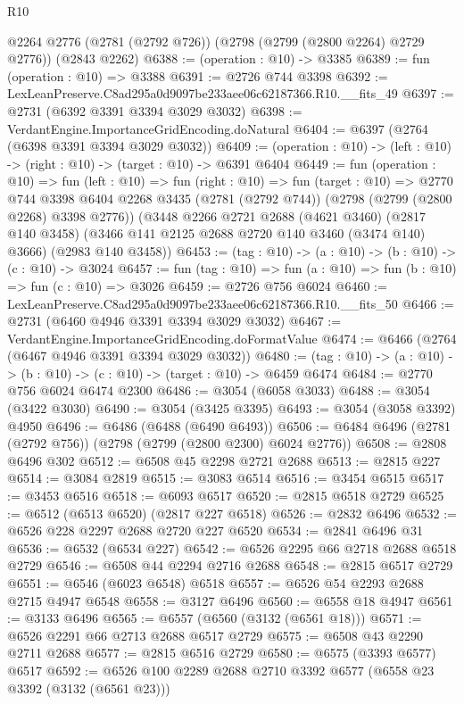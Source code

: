 \begin{lexlean}{R10}
\begin{coremodule}
    @2264
    @2776
    (@2781 (@2792 @726))
    (@2798 (@2799 (@2800 @2264) @2729 @2776))
    (@2843 @2262)
@6388 := (operation : @10) -> @3385
@6389 := fun (operation : @10) => @3388
@6391 := @2726 @744 @3398
@6392 := LexLeanPreserve.C8ad295a0d9097be233aee06c62187366.R10.__fits_49
@6397 := @2731 (@6392 @3391 @3394 @3029 @3032)
@6398 := VerdantEngine.ImportanceGridEncoding.doNatural
@6404 := @6397 (@2764 (@6398 @3391 @3394 @3029 @3032))
@6409 := (operation : @10) -> (left : @10) -> (right : @10) -> (target : @10) -> @6391 @6404
@6449 := fun (operation : @10) =>
  fun (left : @10) =>
  fun (right : @10) =>
  fun (target : @10) =>
  @2770
    @744
    @3398
    @6404
    @2268
    @3435
    (@2781 (@2792 @744))
    (@2798 (@2799 (@2800 @2268) @3398 @2776))
    (@3448
      @2266
      @2721
      @2688
      (@4621 @3460)
      (@2817 @140 @3458)
      (@3466 @141 @2125 @2688 @2720 @140 @3460 (@3474 @140) @3666)
      (@2983 @140 @3458))
@6453 := (tag : @10) -> (a : @10) -> (b : @10) -> (c : @10) -> @3024
@6457 := fun (tag : @10) => fun (a : @10) => fun (b : @10) => fun (c : @10) => @3026
@6459 := @2726 @756 @6024
@6460 := LexLeanPreserve.C8ad295a0d9097be233aee06c62187366.R10.__fits_50
@6466 := @2731 (@6460 @4946 @3391 @3394 @3029 @3032)
@6467 := VerdantEngine.ImportanceGridEncoding.doFormatValue
@6474 := @6466 (@2764 (@6467 @4946 @3391 @3394 @3029 @3032))
@6480 := (tag : @10) -> (a : @10) -> (b : @10) -> (c : @10) -> (target : @10) -> @6459 @6474
@6484 := @2770 @756 @6024 @6474 @2300
@6486 := @3054 (@6058 @3033)
@6488 := @3054 (@3422 @3030)
@6490 := @3054 (@3425 @3395)
@6493 := @3054 (@3058 @3392) @4950
@6496 := @6486 (@6488 (@6490 @6493))
@6506 := @6484 @6496 (@2781 (@2792 @756)) (@2798 (@2799 (@2800 @2300) @6024 @2776))
@6508 := @2808 @6496 @302
@6512 := @6508 @45 @2298 @2721 @2688
@6513 := @2815 @227
@6514 := @3084 @2819
@6515 := @3083 @6514
@6516 := @3454 @6515
@6517 := @3453 @6516
@6518 := @6093 @6517
@6520 := @2815 @6518 @2729
@6525 := @6512 (@6513 @6520) (@2817 @227 @6518)
@6526 := @2832 @6496
@6532 := @6526 @228 @2297 @2688 @2720 @227 @6520
@6534 := @2841 @6496 @31
@6536 := @6532 (@6534 @227)
@6542 := @6526 @2295 @66 @2718 @2688 @6518 @2729
@6546 := @6508 @44 @2294 @2716 @2688
@6548 := @2815 @6517 @2729
@6551 := @6546 (@6023 @6548) @6518
@6557 := @6526 @54 @2293 @2688 @2715 @4947 @6548
@6558 := @3127 @6496
@6560 := @6558 @18 @4947
@6561 := @3133 @6496
@6565 := @6557 (@6560 (@3132 (@6561 @18)))
@6571 := @6526 @2291 @66 @2713 @2688 @6517 @2729
@6575 := @6508 @43 @2290 @2711 @2688
@6577 := @2815 @6516 @2729
@6580 := @6575 (@3393 @6577) @6517
@6592 := @6526 @100 @2289 @2688 @2710 @3392 @6577 (@6558 @23 @3392 (@3132 (@6561 @23)))

\end{coremodule}
\end{lexlean}
